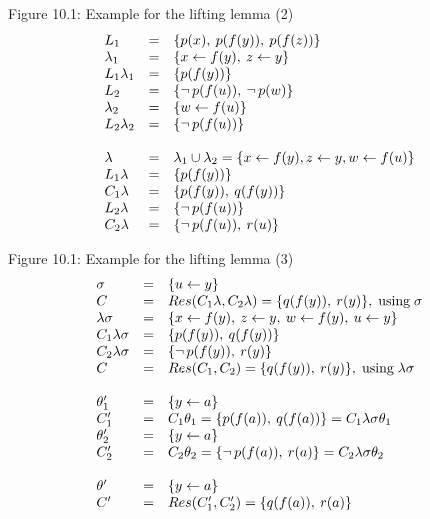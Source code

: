 \documentclass[style=simple,size=12pt]{powerdot}
\begin{document}
\begin{wideslide}[bm=,toc=]{Figure 10.1: Example for the lifting lemma (2)}
\vspace*{-1ex}
\begin{displaymath}
\begin{array}{lcl}
L_{1}&=&\{p(x),\: p(f(y)),\: p(f(z)) \}\\
\lambda_{1}&=&\{x\leftarrow f(y),\: z\leftarrow y\}\\
L_{1}\lambda_{1}&=&\{p(f(y)) \}\\
L_{2}&=&\{\mathop{\neg} p(f(u)),\: \mathop{\neg} p(w) \}\\
\lambda_{2}&=&\{w\leftarrow f(u)\}\\
L_{2}\lambda_{2}&=&\{\mathop{\neg} p(f(u)) \}\\
\\
\lambda&=& \lambda_{1}\cup\lambda_{2} =
  \{x\leftarrow f(y), z\leftarrow y, w\leftarrow f(u) \}\\
L_{1}\lambda&=&\{p(f(y)) \}\\
C_{1}\lambda&=& \{p(f(y)) ,\: q(f(y))\} \\
L_{2}\lambda&=&\{\mathop{\neg} p(f(u)) \}\\
C_{2}\lambda&=& \{\mathop{\neg} p(f(u)) ,\: r(u)\}
\end{array}
\end{displaymath}
\end{wideslide}

\begin{wideslide}[bm=,toc=]{Figure 10.1: Example for the lifting lemma (3)}
\vspace*{-5ex}
\begin{displaymath}
\begin{array}{lcl}
\sigma&=&\{u\leftarrow y \}\\
C&=& Res(C_{1}\lambda,C_{2}\lambda)  = \{q(f(y)) ,\: r(y)\}, \;\mbox{using}\; \sigma\\
\lambda\sigma&=&\{x\leftarrow f(y),\: z\leftarrow y,\:
    w\leftarrow f(y),\: u\leftarrow y \}\\
C_{1}\lambda\sigma&=& \{p(f(y)) ,\: q(f(y))\} \\
C_{2}\lambda\sigma&=& \{\mathop{\neg} p(f(y)) ,\: r(y)\} \\
C&=& Res(C_{1},C_{2})  = \{q(f(y)) ,\: r(y)\}, \;\mbox{using}\; \lambda\sigma\\
\\
\theta_{1}'&=&\{y\leftarrow a\}\\
C_{1}'&=& C_{1}\theta_{1} = \{p(f(a)) ,\:  q(f(a))\} = C_{1}\lambda\sigma\theta_{1}\\
\theta_{2}'&=&\{y\leftarrow a\}\\
C_{2}'&=& C_{2}\theta_{2} = \{\mathop{\neg} p(f(a)) ,\: r(a)\} = C_{2}\lambda\sigma\theta_{2}\\
\\
\theta'&=&\{y\leftarrow a \}\\
C'&=& Res(C_{1}',C_{2}')  = \{q(f(a)) ,\: r(a)\}
\end{array}
\end{displaymath}
\end{wideslide}
\end{document}
